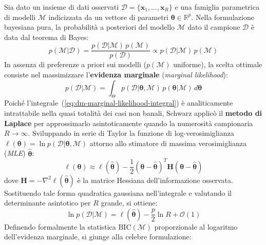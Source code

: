 Sia dato un insieme di dati osservati $\mathcal{D} = \{\mathbf{x}_1, \dots, \mathbf{x}_R\}$ e una famiglia parametrica di modelli $\mathcal{M}$ indicizzata da un vettore di parametri $\boldsymbol{\theta} \in \mathbb{R}^p$. Nella formulazione bayesiana pura, la probabilità a posteriori del modello $\mathcal{M}$ dato il campione $\mathcal{D}$ è data dal teorema di Bayes:
\begin{equation}
\label{eq:dm-bayes-model-posterior}
p(\mathcal{M} | \mathcal{D}) = \frac{p(\mathcal{D} | \mathcal{M}) \, p(\mathcal{M})}{p(\mathcal{D})} \propto p(\mathcal{D} | \mathcal{M}) \, p(\mathcal{M})
\end{equation}
In assenza di preferenze a priori sui modelli ($p(\mathcal{M})$ uniforme), la scelta ottimale consiste nel massimizzare l'\textbf{evidenza marginale} (\textit{marginal likelihood}):
\begin{equation}
\label{eq:dm-marginal-likelihood-integral}
p(\mathcal{D} | \mathcal{M}) = \int_{\Theta} p(\mathcal{D} | \boldsymbol{\theta}, \mathcal{M}) \, p(\boldsymbol{\theta} | \mathcal{M}) \, d\boldsymbol{\theta}
\end{equation}
Poiché l'integrale~(\ref{eq:dm-marginal-likelihood-integral}) è analiticamente intrattabile nella quasi totalità dei casi non banali, Schwarz applicò il \textbf{metodo di Laplace} per approssimarlo asintoticamente quando la numerosità campionaria $R \to \infty$. Sviluppando in serie di Taylor la funzione di log-verosimiglianza $\ell(\boldsymbol{\theta}) = \ln p(\mathcal{D} | \boldsymbol{\theta}, \mathcal{M})$ attorno allo stimatore di massima verosimiglianza (\textit{MLE}) $\hat{\boldsymbol{\theta}}$:
\begin{equation}
\label{eq:dm-taylor-laplace}
\ell(\boldsymbol{\theta}) \approx \ell(\hat{\boldsymbol{\theta}}) - \frac{1}{2} (\boldsymbol{\theta} - \hat{\boldsymbol{\theta}})^T \mathbf{H} (\boldsymbol{\theta} - \hat{\boldsymbol{\theta}})
\end{equation}
dove $\mathbf{H} = -\nabla^2 \ell(\hat{\boldsymbol{\theta}})$ è la matrice Hessiana dell'informazione osservata. Sostituendo tale forma quadratica gaussiana nell'integrale e valutando il determinante asintotico per $R$ grande, si ottiene:
\begin{equation}
\label{eq:dm-bic-derivation-limit}
\ln p(\mathcal{D} | \mathcal{M}) = \ell(\hat{\boldsymbol{\theta}}) - \frac{p}{2} \ln R + \mathcal{O}(1)
\end{equation}
Definendo formalmente la statistica $\mathrm{BIC}(\mathcal{M})$ proporzionale al logaritmo dell'evidenza marginale, si giunge alla celebre formulazione:
